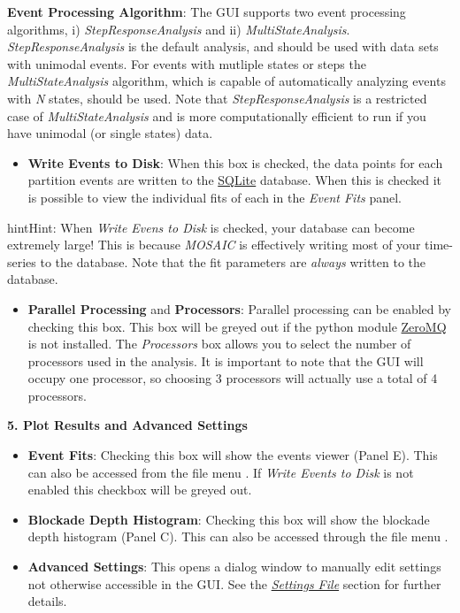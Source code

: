 \documentclass[letterpaper,10pt,english]{sphinxmanual}
\begin{document}
\textbf{Event Processing Algorithm}: The GUI supports two event processing algorithms, i) \emph{StepResponseAnalysis} and ii) \emph{MultiStateAnalysis}. \emph{StepResponseAnalysis} is the default analysis, and should be used with data sets with unimodal events. For events with mutliple states or steps the \emph{MultiStateAnalysis} algorithm, which is capable of automatically analyzing events with \emph{N} states, should be used. Note that \emph{StepResponseAnalysis} is a restricted case of \emph{MultiStateAnalysis} and is more computationally efficient to run if you have unimodal (or single states) data.
\begin{itemize}
\item {} 
\textbf{Write Events to Disk}: When this box is checked, the data points for each partition events are written to the \href{http://www.sqlite.org/}{SQLite} database. When this is checked it is possible to view the individual fits of each  in the \emph{Event Fits} panel.

\end{itemize}

\begin{notice}{hint}{Hint:}
When \emph{Write Evens to Disk} is checked, your database can become extremely large! This is because \emph{MOSAIC} is effectively writing most of your time-series to the database. Note that the fit parameters are \emph{always} written to the database.
\end{notice}
\begin{itemize}
\item {} 
\textbf{Parallel Processing} and \textbf{Processors}: Parallel processing can be enabled by checking this box. This box will be greyed out if the python module \href{http://zeromq.github.io/pyzmq/}{ZeroMQ} is not installed. The \emph{Processors} box allows you to select the number of processors used in the analysis. It is important to note that the GUI will occupy one processor, so choosing 3 processors will actually use a total of 4 processors.

\end{itemize}

\textbf{5. Plot Results and Advanced Settings}
\begin{itemize}
\item {} 
\textbf{Event Fits}: Checking this box will show the events viewer (Panel E). This can also be accessed from the file menu . If \emph{Write Events to Disk} is not enabled this checkbox will be greyed out.

\item {} 
\textbf{Blockade Depth Histogram}: Checking this box will show the blockade depth histogram (Panel C). This can also be accessed through the file menu .

\item {} 
\textbf{Advanced Settings}: This opens a dialog window to manually edit settings not otherwise accessible in the GUI. See the {\hyperref[doc/settingsFile:settings\string-page]{\emph{Settings File}}} section for further details.

\end{itemize}
\end{document}
